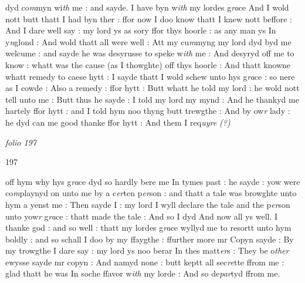 \documentclass[12pt, a4paper]{book}
\begin{document}
				
					
				\marginpar[\vspace{0.5cm}{\textcolor{Gray}{Coppyn late maier}}]{}
			
					
		\ifthenelse{\isodd{\thepage}}
		{\reversemarginpar}
		{\normalmarginpar}
		dyd co\textit{m}myn wi\textit{th} me : and sayde. I have byn w\textit{ith} my lordes g\textit{ra}ce And I wold nott butt thatt I had byn ther : ffor now I doo know thatt I knew nott beffore : And I dare well say : my lord ys as sory ffor thys hoorle : as any man ys In y\textit{n}glond : And wold thatt all were well : Att my cu\textit{m}myng my lord dyd byd me welcume : and sayde he was desyrusse to speke w\textit{ith} me : And desyryd off me to know : whatt was the cause (as I  thowghte) off thys hoorle : And thatt knowne whatt remedy to caese hytt : I sayde thatt I wold schew unto hys g\textit{ra}ce : so nere as I cowde : Also a remedy : ffor hytt : Butt whatt he told my lord : he wold nott tell unto me : Butt thus he sayde : I told my lord my mynd : And he thankyd me hartely ffor hytt : and I told hym noo thyng butt trewgthe : And  by ow\textit{r} lady : he dyd can me good thanke ffor hytt : And them I req\textit{uyre (?)}
					
				
      				
\dotfill
						\newpage
{}

\textit{folio 197}
      				
      				
      				\begin{flushright}{\color{Mahogany}197}\end{flushright}
      				
      					
		\ifthenelse{\isodd{\thepage}}
		{\reversemarginpar}
		{\normalmarginpar}
		off hym why hys g\textit{ra}ce dyd so hardly bere me In tymes past : he sayde :  yow were co\textit{m}playnyd on unto me by a c\textit{er}ten p\textit{er}son : and thatt a tale was browghte unto hym a yenst me : Then sayde I : my lord I wyll declare the tale and the p\textit{er}son unto yow\textit{r }g\textit{ra}ce : thatt made the tale : And so I dyd And now all ys well. I thanke god : and so well : thatt my lordes g\textit{ra}ce wyllyd me to resortt unto hym boldly : and so schall I doo by my ffaygthe : ffurther more mr Copyn sayde : By my trowgthe I dare say : my lord ys noo berar In thes matt\textit{er}s : They be o\textit{ther} ewysse sayde mr copyn : And namyd none : butt keptt all sec\textit{re}tte ffrom me : glad thatt he was In soche ffavor w\textit{ith} my lorde : And so de\textit{par}tyd ffrom me.  
      				
\end{document}
